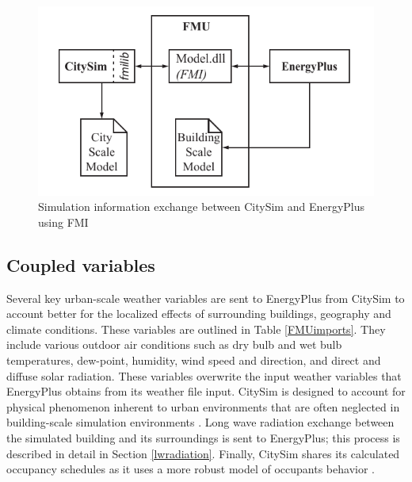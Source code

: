 \documentclass{tBPS2e}
\theoremstyle{plain}
\theoremstyle{definition}
\theoremstyle{remark}
\begin{document}
\begin{figure}[H]
\centering
\includegraphics[scale=0.7]{figures/UMEM_FMU_Overview}
\caption{Simulation information exchange between CitySim and EnergyPlus using FMI \citep{thomas2014multiscale}}
\label{fig:FMUOverview}
\end{figure}



\subsection{Coupled variables}

Several key urban-scale weather variables are sent to EnergyPlus from CitySim
to account better for the localized effects of surrounding buildings,
geography and climate conditions. These variables are outlined in Table \ref{FMUimports}. 
They include various outdoor air
conditions such as dry bulb and wet bulb temperatures, dew-point, humidity, wind
speed and direction, and direct and diffuse solar radiation. These variables
overwrite the input weather variables that EnergyPlus obtains from its weather
file input. CitySim is designed to account for physical phenomenon inherent to
urban environments that are often neglected in building-scale simulation
environments \citep{Robinson:2004cr,Robinson:2009tm}. Long wave radiation
exchange between the simulated building and its surroundings is sent to
EnergyPlus; this process is described in detail in Section \ref{lwradiation}.
Finally, CitySim shares its calculated occupancy schedules as it uses a more
robust model of occupants behavior
\citep{Haldi:2011dr}.
\end{document}
